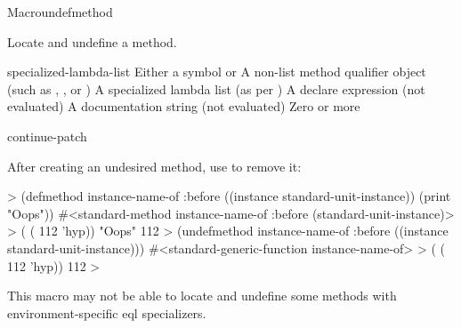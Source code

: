 \documentclass[10pt,twoside,english,pdftex]{article}
\begin{document}
\begin{functiondoc}{Macro}{undefmethod}{%
    }
%
%
%
  
\fnsyntax

\fnpurpose Locate and undefine a method.

\fnpackage {}

\fnmodule {}

\fnargs
\begin{args}{specialized-lambda-list}
 Either a symbol or 
 A non-list method qualifier object (such as
, , or )
 A specialized lambda list (as per
) 
\arg[declarations] A declare expression (not evaluated)
\arg[documentation] A documentation string (not evaluated)
\arg[forms] Zero or more 
\end{args}

\begin{alsos}{continue-patch}
\also[patch]
\end{alsos}

\fnexample
{}%
%
After creating an undesired method, use  to remove it:
%
\W\supp
\begin{example}
  > (defmethod instance-name-of :before ((instance standard-unit-instance))
       (print "Oops"))
  #<standard-method instance-name-of :before (standard-unit-instance)>
  > ( ( 112 'hyp))
  "Oops" 
  112
  > (undefmethod instance-name-of :before ((instance standard-unit-instance)))
  #<standard-generic-function instance-name-of>
  > ( ( 112 'hyp))
  112
  >
\end{example}

\fnnote This macro may not be able to locate and undefine some methods with
environment-specific eql specializers.

\end{functiondoc}
\end{document}
